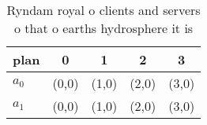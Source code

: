 \documentclass[a4paper]{article}
\begin{document}
\begin{table}
\begin{adjustbox}{width=0.6\columnwidth}
\begin{tabular}{|l|l|l|l|l|}
\hline
\textbf{plan} & \multicolumn{1}{c|}{\textbf{0}} & \multicolumn{1}{c|}{\textbf{1}} & \multicolumn{1}{c|}{\textbf{2}} & \multicolumn{1}{c|}{\textbf{3}} \\ \hline
\textbf{$a_0$}  & (0,0) & (1,0) & (2,0) & (3,0) \\ \hline
\textbf{$a_1$}  & (0,0) & (1,0) & (2,0) & (3,0) \\ \hline
\end{tabular}
\end{adjustbox}
\caption{Ryndam royal o clients and servers o that o earths hydrosphere it is 
}
\end{table}
\end{document}
